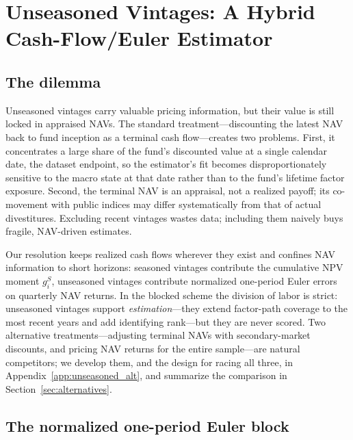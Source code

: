 \documentclass[11pt]{article}
\begin{document}
\section{Unseasoned Vintages: A Hybrid Cash-Flow/Euler Estimator}
\label{sec:unseasoned}

\subsection{The dilemma}

Unseasoned vintages carry valuable pricing information, but their value is still locked in appraised NAVs. The standard treatment---discounting the latest NAV back to fund inception as a terminal cash flow---creates two problems. First, it concentrates a large share of the fund's discounted value at a single calendar date, the dataset endpoint, so the estimator's fit becomes disproportionately sensitive to the macro state at that date rather than to the fund's lifetime factor exposure. Second, the terminal NAV is an appraisal, not a realized payoff; its co-movement with public indices may differ systematically from that of actual divestitures. Excluding recent vintages wastes data; including them naively buys fragile, NAV-driven estimates.

Our resolution keeps realized cash flows wherever they exist and confines NAV information to short horizons: seasoned vintages contribute the cumulative NPV moment \(g_i^S\), unseasoned vintages contribute normalized one-period Euler errors on quarterly NAV returns. In the blocked scheme the division of labor is strict: unseasoned vintages support \emph{estimation}---they extend factor-path coverage to the most recent years and add identifying rank---but they are never scored. Two alternative treatments---adjusting terminal NAVs with secondary-market discounts, and pricing NAV returns for the entire sample---are natural competitors; we develop them, and the design for racing all three, in Appendix~\ref{app:unseasoned_alt}, and summarize the comparison in Section~\ref{sec:alternatives}.

\subsection{The normalized one-period Euler block}
\label{sec:euler_block}
\end{document}
